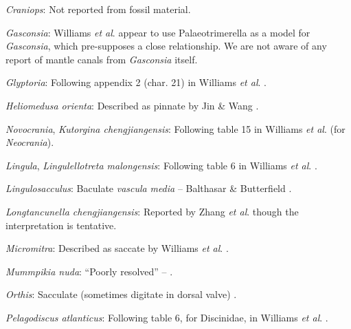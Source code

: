 \documentclass[openany]{book}
\theoremstyle{definition}
\theoremstyle{definition}
\theoremstyle{definition}
\theoremstyle{remark}
\begin{document}
\hypertarget{Craniops-coding-34}{}
\emph{Craniops}: Not reported from fossil material.

\hypertarget{Gasconsia-coding-34}{}
\emph{Gasconsia}: Williams \emph{et al}. \citeyearpar[table
15]{Williams2000LinguliformeaCraniiformea} appear to use
Palaeotrimerella \citep[as drawn in][]{Williams1997Introduction} as a
model for \emph{Gasconsia}, which pre-supposes a close relationship. We
are not aware of any report of mantle canals from \emph{Gasconsia}
itself.

\hypertarget{Glyptoria-coding-34}{}
\emph{Glyptoria}: Following appendix 2 (char. 21) in Williams \emph{et
al}. \citeyearpar{Williams1998Thediversity}.

\hypertarget{Heliomedusa_orienta-coding-34}{}
\emph{Heliomedusa orienta}: Described as pinnate by Jin \& Wang
\citeyearpar{Jin1992Revisionof}.

\hypertarget{Kutorgina_chengjiangensis-coding-34}{}
\emph{Novocrania}, \emph{Kutorgina chengjiangensis}: Following table 15
in Williams \emph{et al}.
\citeyearpar{Williams2000LinguliformeaCraniiformea} (for
\emph{Neocrania}).

\hypertarget{Lingula-coding-34}{}
\emph{Lingula}, \emph{Lingulellotreta malongensis}: Following table 6 in
Williams \emph{et al}.
\citeyearpar{Williams2000LinguliformeaCraniiformea}.

\hypertarget{Lingulosacculus-coding-34}{}
\emph{Lingulosacculus}: Baculate \emph{vascula} \emph{media} --
Balthasar \& Butterfield \citeyearpar{Balthasar2009EarlyCambrian}.

\hypertarget{Longtancunella_chengjiangensis-coding-34}{}
\emph{Longtancunella chengjiangensis}: Reported by Zhang \emph{et al}.
\citeyearpar[2011T]{Zhang2007Agregarious} though the interpretation is
tentative.

\hypertarget{Micromitra-coding-34}{}
\emph{Micromitra}: Described as saccate by Williams \emph{et al}.
\citeyearpar{Williams1998Thediversity}.

\hypertarget{Mummpikia_nuda-coding-34}{}
\emph{Mummpikia nuda}: ``Poorly resolved'' --
\citet{Balthasar2008iMummpikia}.

\hypertarget{Orthis-coding-34}{}
\emph{Orthis}: Sacculate (sometimes digitate in dorsal valve)
\citep[p716]{Williams2000LinguliformeaCraniiformea}.

\hypertarget{Pelagodiscus_atlanticus-coding-34}{}
\emph{Pelagodiscus atlanticus}: Following table 6, for Discinidae, in
Williams \emph{et al}.
\citeyearpar{Williams2000LinguliformeaCraniiformea}.
\end{document}
